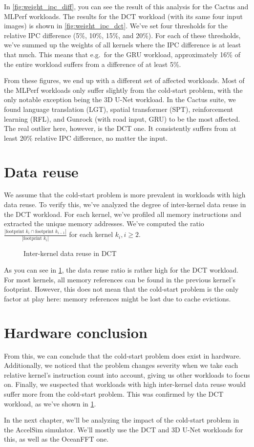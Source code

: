In \cref{fig:weight_ipc_diff}, you can see the result of this analysis for the Cactus and MLPerf workloads.
The results for the DCT workload (with its same four input images) is shown in \cref{fig:weight_ipc_dct}.
We've set four thresholds for the relative IPC difference (5\%, 10\%, 15\%, and 20\%).
For each of these thresholds, we've summed up the weights of all kernels where the IPC difference is at least that much.
This means that e.g.\ for the GRU workload, approximately 16\% of the entire workload suffers from a difference of at least 5\%.

From these figures, we end up with a different set of affected workloads.
Most of the MLPerf workloads only suffer slightly from the cold-start problem, with the only notable exception being the 3D U-Net workload.
In the Cactus suite, we found language translation (LGT), spatial transformer (SPT), reinforcement learning (RFL), and Gunrock (with road input, GRU) to be the most affected.
The real outlier here, however, is the DCT one.
It consistently suffers from at least 20\% relative IPC difference, no matter the input.

\FloatBarrier

\section{Data reuse}\label{sec:data-reuse}
We assume that the cold-start problem is more prevalent in workloads with high data reuse.
To verify this, we've analyzed the degree of inter-kernel data reuse in the DCT workload.
For each kernel, we've profiled all memory instructions and extracted the unique memory addresses.
We've computed the ratio $\frac{|\text{footprint } k_i \cap \text{footprint } k_{i-1}|}{|\text{footprint } k_i|}$ for each kernel $k_i, i \geq 2$.

\begin{figure}
    \centering
    \resizebox{0.45\textwidth}{!}{}
    \caption{Inter-kernel data reuse in DCT}
    \label{fig:dct_reuse}
\end{figure}

As you can see in \cref{fig:dct_reuse}, the data reuse ratio is rather high for the DCT workload.
For most kernels, all memory references can be found in the previous kernel's footprint.
However, this does not mean that the cold-start problem is the only factor at play here: memory references might be lost due to cache evictions.

\FloatBarrier
\section{Hardware conclusion}\label{sec:hw-conclusion}
From this, we can conclude that the cold-start problem does exist in hardware.
Additionally, we noticed that the problem changes severity when we take each relative kernel's instruction count into account, giving us other workloads to focus on.
Finally, we suspected that workloads with high inter-kernel data reuse would suffer more from the cold-start problem.
This was confirmed by the DCT workload, as we've shown in \cref{fig:dct_reuse}.

In the next chapter, we'll be analyzing the impact of the cold-start problem in the AccelSim simulator.
We'll mostly use the DCT and 3D U-Net workloads for this, as well as the OceanFFT one.
